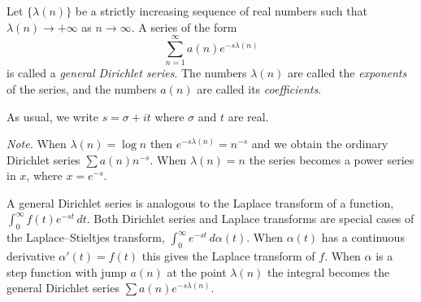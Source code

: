 Let $\{\lambda(n)\}$ be a strictly increasing sequence of real numbers such that $\lambda(n) \to +\infty$ as $n \to \infty$. A series of the form
$$\sum_{n=1}^{\infty} a(n)e^{-s\lambda(n)}$$
is called a \emph{general Dirichlet series}. The numbers $\lambda(n)$ are called the \emph{exponents} of the series, and the numbers $a(n)$ are called its \emph{coefficients}.

As usual, we write $s = \sigma + it$ where $\sigma$ and $t$ are real.

\textit{Note.} When $\lambda(n) = \log n$ then $e^{-s\lambda(n)} = n^{-s}$ and we obtain the ordinary Dirichlet series $\sum a(n)n^{-s}$. When $\lambda(n) = n$ the series becomes a power series in $x$, where $x = e^{-s}$.

A general Dirichlet series is analogous to the Laplace transform of a function, $\int_0^\infty f(t)e^{-st}\,dt$. Both Dirichlet series and Laplace transforms are special cases of the Laplace--Stieltjes transform, $\int_0^\infty e^{-st}\,d\alpha(t)$. When $\alpha(t)$ has a continuous derivative $\alpha'(t) = f(t)$ this gives the Laplace transform of $f$. When $\alpha$ is a step function with jump $a(n)$ at the point $\lambda(n)$ the integral becomes the general Dirichlet series $\sum a(n)e^{-s\lambda(n)}$.
